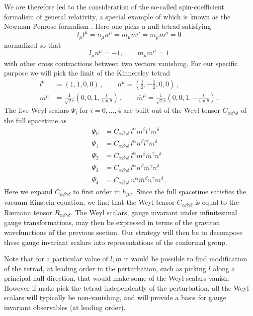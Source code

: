 \documentclass{brownthesis}
\begin{document}
We are therefore led to the consideration of the so-called spin-coefficient
formalism \cite{deFelice:1990hu} of general relativity, a special
example of which is known as the Newman-Penrose formalism \cite{doi:10.1063/1.1724257}.
Here one picks a null tetrad satisfying
\[
l_{\mu}l^{\mu}=n_{\mu}n^{\mu}=m_{\mu}m^{\mu}=\bar{m}_{\mu}\bar{m}^{\mu}=0
\]
normalized so that
\[
l_{\mu}n^{\mu}=-1,\qquad m_{\mu}\bar{m}^{\mu}=1
\]
with other cross contractions between two vectors vanishing. For our
specific purpose we will pick the limit of the Kinnersley tetrad \cite{kinnersley}
\begin{align}
l^{\mu} & =\left(1,1,0,0\right)\,,\qquad n^{\mu}=\left(\frac{1}{2},-\frac{1}{2},0,0\right)\,,\nonumber \\
m^{\mu} & =\frac{1}{\sqrt{2}r}\left(0,0,1,\frac{i}{\sin\theta}\right)\,,\qquad\bar{m}^{\mu}=\frac{1}{\sqrt{2}r}\left(0,0,1,-\frac{i}{\sin\theta}\right)\,.\label{eq:kinner}
\end{align}
The five Weyl scalars $\Psi_{i}$ for $i=0,\ldots,4$ are built out
of the Weyl tensor $C_{\alpha\beta\gamma\delta}$ of the full spacetime
as
\begin{align}
\Psi_{0} & =C_{\alpha\beta\gamma\delta}\,l^{\alpha}m^{\beta}l^{\gamma}m^{\delta}\label{eq:weylscalarstart}\\
\Psi_{1} & =C_{\alpha\beta\gamma\delta}\,l^{\alpha}n^{\beta}l^{\gamma}m^{\delta}\\
\Psi_{2} & =C_{\alpha\beta\gamma\delta}\,l^{\alpha}m^{\beta}\bar{m}^{\gamma}n^{\delta}\\
\Psi_{3} & =C_{\alpha\beta\gamma\delta}\,l^{\alpha}n^{\beta}\bar{m}^{\gamma}n^{\delta}\\
\Psi_{4} & =C_{\alpha\beta\gamma\delta}\,n^{\alpha}\bar{m}^{\beta}n^{\gamma}m^{\delta}\,.\label{eq:weylscalarend}
\end{align}
Here we expand $C_{\alpha\beta\gamma\delta}$ to first order in $h_{\mu\nu}$.
Since the full spacetime satisfies the vacuum Einstein equation, we
find that the Weyl tensor $C_{\alpha\beta\gamma\delta}$ is equal
to the Riemann tensor $R_{\alpha\beta\gamma\delta}$. The Weyl scalars,
gauge invariant under infinitesimal gauge transformations, may then
be expressed in terms of the graviton wavefunctions of the previous
section. Our strategy will then be to decompose these gauge invariant
scalars into representations of the conformal group.

Note that for a particular value of $l,m$ it would be possible to
find modification of the tetrad, at leading order in the perturbation,
such as picking $l$ along a principal null direction, that would
make some of the Weyl scalars vanish. However if make pick the tetrad
independently of the perturbation, all the Weyl scalars will typically
be non-vanishing, and will provide a basis for gauge invariant observables
(at leading order).
\end{document}
